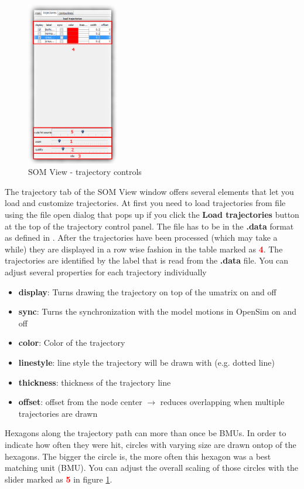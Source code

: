 \documentclass[a4paper]{scrartcl}
\newcommand{\imagenumber}[1]{\textcolor{red}{\textbf{#1}}}
\begin{document}
\begin{figure}
\begin{center}
\includegraphics[width=4cm]{graphics/somview_trajectories.png}
\end{center}
\caption{SOM View - trajectory controls}
\label{fig:controls-trajectories}
\end{figure}
The trajectory tab of the SOM View window offers several elements that let you load and customize trajectories.
At first you need to load trajectories from file using the file open dialog that pops up if you click the \textbf{Load trajectories} button at the top of the trajectory control panel. The file has to be in the \textbf{.data} format as defined in \cite{toolbox-manual}.
After the trajectories have been processed (which may take a while) they are displayed in a row wise fashion in the table marked as \imagenumber{4}. 
The trajectories are identified by the label that is read from the \textbf{.data} file.
You can adjust several properties for each trajectory individually
\begin{itemize}
    \item \textbf{display}: Turns drawing the trajectory on top of the umatrix on and off
    \item \textbf{sync}: Turns the synchronization with the model motions in OpenSim on and off
    \item \textbf{color}: Color of the trajectory
    \item \textbf{linestyle}: line style the trajectory will be drawn with (e.g. dotted line)
    \item \textbf{thickness}: thickness of the trajectory line
	\item \textbf{offset}: offset from the node center $\rightarrow$ reduces overlapping when multiple trajectories are drawn
\end{itemize}
Hexagons along the trajectory path can more than once be BMUs. In order to indicate how often they were hit, circles with varying size are drawn ontop of the hexagons. The bigger the circle is, the more often this hexagon was a best matching unit (BMU). You can adjust the overall scaling of those circles with the slider marked as \imagenumber{5} in figure \ref{fig:controls-trajectories}.
\end{document}
